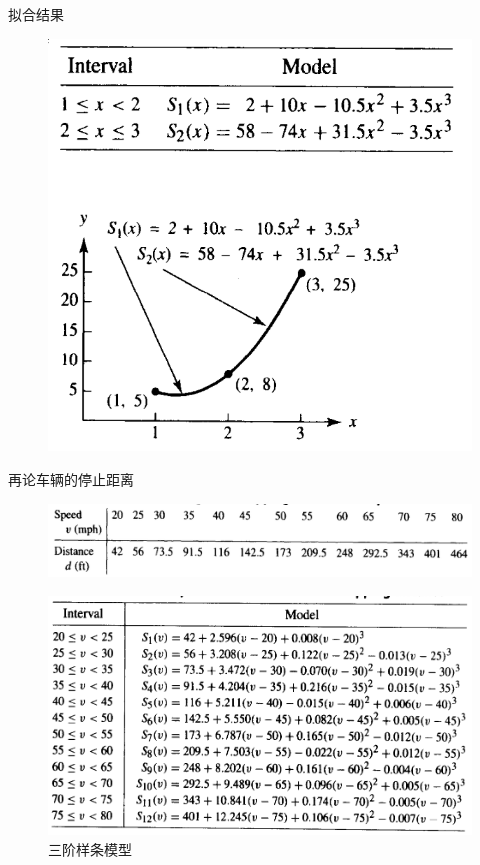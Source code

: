 \documentclass[UTF8]{ctexbeamer}
\begin{document}
\begin{frame}{拟合结果}
  \begin{figure}
    \centering{}
    \includegraphics[width=.5\textwidth{}]{spline-fit.png}
  \end{figure}
  
\end{frame}

\begin{frame}{再论车辆的停止距离}
  \begin{figure}
    \centering{}
    \includegraphics[width=.6\textwidth{}]{car-tab.png}
  \end{figure}

  \begin{figure}
    \centering{}
    \includegraphics[width=.6\textwidth{}]{car-spline.png}
    \caption{三阶样条模型}
  \end{figure}

\end{frame}
\end{document}
